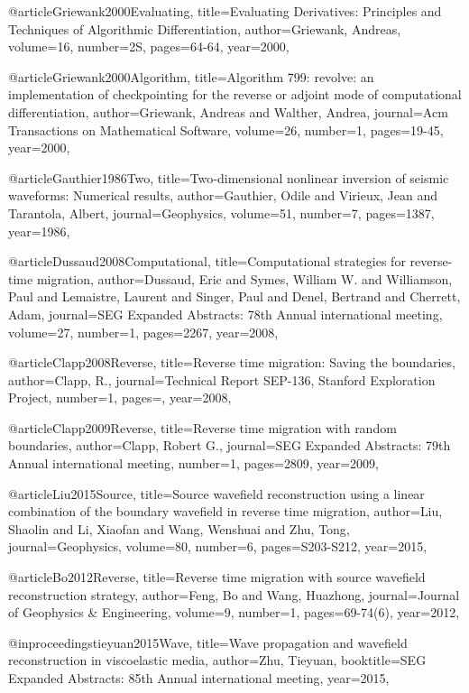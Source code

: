 {@article{Griewank2000Evaluating,
  title={Evaluating Derivatives: Principles and Techniques of Algorithmic Differentiation},
  author={Griewank, Andreas},
  volume={16},
  number={2S},
  pages={64-64},
  year={2000},
}

@article{Griewank2000Algorithm,
  title={Algorithm 799: revolve: an implementation of checkpointing for the reverse or adjoint mode of computational differentiation},
  author={Griewank, Andreas and Walther, Andrea},
  journal={Acm Transactions on Mathematical Software},
  volume={26},
  number={1},
  pages={19-45},
  year={2000},
}

@article{Gauthier1986Two,
  title={Two‐dimensional nonlinear inversion of seismic waveforms: Numerical results},
  author={Gauthier, Odile and Virieux, Jean and Tarantola, Albert},
  journal={Geophysics},
  volume={51},
  number={7},
  pages={1387},
  year={1986},
}

@article{Dussaud2008Computational,
  title={Computational strategies for reverse-time migration},
  author={Dussaud, Eric and Symes, William W. and Williamson, Paul and Lemaistre, Laurent and Singer, Paul and Denel, Bertrand and Cherrett, Adam},
  journal={SEG Expanded Abstracts: 78th Annual international meeting},
  volume={27},
  number={1},
  pages={2267},
  year={2008},
}

@article{Clapp2008Reverse,
  title={Reverse time migration: Saving the boundaries},
  author={Clapp, R.},
  journal={Technical Report SEP-136, Stanford Exploration Project},
  number={1},
  pages={},
  year={2008},
}

@article{Clapp2009Reverse,
  title={Reverse time migration with random boundaries},
  author={Clapp, Robert G.},
  journal={SEG Expanded Abstracts: 79th Annual international meeting},
  number={1},
  pages={2809},
  year={2009},
}

@article{Liu2015Source,
  title={Source wavefield reconstruction using a linear combination of the boundary wavefield in reverse time migration},
  author={Liu, Shaolin and Li, Xiaofan and Wang, Wenshuai and Zhu, Tong},
  journal={Geophysics},
  volume={80},
  number={6},
  pages={S203-S212},
  year={2015},
}

@article{Bo2012Reverse,
  title={Reverse time migration with source wavefield reconstruction strategy},
  author={Feng, Bo and Wang, Huazhong},
  journal={Journal of Geophysics \& Engineering},
  volume={9},
  number={1},
  pages={69-74(6)},
  year={2012},
}

@inproceedings{tieyuan2015Wave,
  title={Wave propagation and wavefield reconstruction in viscoelastic media},
  author={Zhu, Tieyuan},
  booktitle={SEG Expanded Abstracts: 85th Annual international meeting},
  year={2015},
}

}

